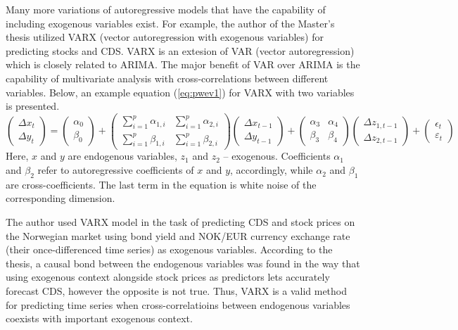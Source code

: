 \documentclass[13pt, a4paper]{article}
\begin{document}
Many more variations of autoregressive models that have the capability of including exogenous variables exist. For example, the author of the Master's thesis \cite{ding2021empirical} utilized VARX (vector autoregression with exogenous variables) for predicting stocks and CDS. VARX is an extesion of VAR (vector autoregression) which is closely related to ARIMA. The major benefit of VAR over ARIMA is the capability of multivariate analysis with cross-correlations between different variables. Below, an example equation (\ref{eq:pwev1}) for VARX with two variables is presented.
\begin{equation} \label{eq:pwev1}
\begin{pmatrix}\Delta x_t \\ \Delta y_t \end{pmatrix}
= \begin{pmatrix}\alpha_0 \\ \beta_0 \end{pmatrix}
+ \begin{pmatrix}\sum_{i=1}^p \alpha_{1,i} & \sum_{i=1}^p \alpha_{2,i} \\ \sum_{i=1}^p \beta_{1,i} & \sum_{i=1}^p \beta_{2,i} \end{pmatrix}
\begin{pmatrix}\Delta x_{t-1} \\ \Delta y_{t-1} \end{pmatrix}
+ \begin{pmatrix}\alpha_3 & \alpha_4 \\ \beta_3 & \beta_4 \end{pmatrix}
\begin{pmatrix}\Delta z_{1, t-1} \\ \Delta z_{2, t-1} \end{pmatrix}
+ \begin{pmatrix}\epsilon_t \\ \varepsilon_t \end{pmatrix}
\end{equation}
Here, $x$ and $y$ are endogenous variables, $z_1$ and $z_2$ -- exogenous. Coefficients $\alpha_1$ and $\beta_2$ refer to autoregressive coefficients of $x$ and $y$, accordingly, while $\alpha_2$ and $\beta_1$ are cross-coefficients. The last term in the equation is white noise of the corresponding dimension.

The author used VARX model in the task of predicting CDS and stock prices on the Norwegian market using bond yield and NOK/EUR currency exchange rate (their once-differenced time series) as exogenous variables. According to the thesis, a causal bond between the endogenous variables was found in the way that using exogenous context alongside stock prices as predictors lets accurately forecast CDS, however the opposite is not true. Thus, VARX is a valid method for predicting time series when cross-correlatioins between endogenous variables coexists with important exogenous context. 
\end{document}
